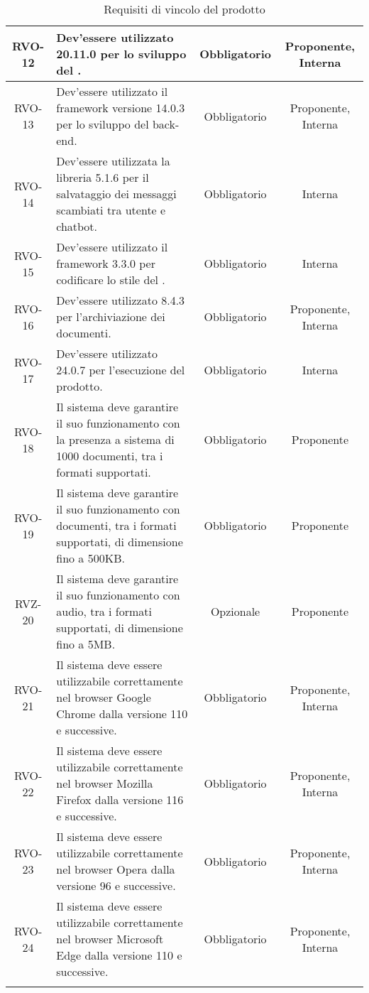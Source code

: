 \begin{xltabular}{\textwidth}{| c | X | c | c |}
    \hline
    RVO-12 & Dev'essere utilizzato  20.11.0 per lo sviluppo del . & Obbligatorio & Proponente, Interna \\
    \hline
    RVO-13 & Dev'essere utilizzato il framework  versione 14.0.3 per lo sviluppo del back-end. & Obbligatorio & Proponente, Interna \\
    \hline
    RVO-14 & Dev'essere utilizzata la libreria  5.1.6 per il salvataggio dei messaggi scambiati tra utente e chatbot. & Obbligatorio & Interna \\
    \hline
    RVO-15 & Dev'essere utilizzato il framework  3.3.0 per codificare lo stile del . & Obbligatorio & Interna \\
    \hline
    RVO-16 & Dev'essere utilizzato  8.4.3 per l'archiviazione dei documenti. & Obbligatorio & Proponente, Interna \\
    \hline
    RVO-17 & Dev'essere utilizzato  24.0.7 per l'esecuzione del prodotto. & Obbligatorio & Interna \\
    \hline
    RVO-18 & Il sistema deve garantire il suo funzionamento con la presenza a sistema di 1000 documenti, tra i formati supportati.  & Obbligatorio & Proponente\\ %
    \hline
    RVO-19 & Il sistema deve garantire il suo funzionamento con documenti, tra i formati supportati, di dimensione fino a 500KB. & Obbligatorio & Proponente\\ %
    \hline
    RVZ-20 & Il sistema deve garantire il suo funzionamento con audio, tra i formati supportati, di dimensione fino a 5MB. & Opzionale & Proponente\\
    \hline %
    RVO-21 & Il sistema deve essere utilizzabile correttamente nel browser Google Chrome dalla versione 110 e successive. & Obbligatorio & Proponente, Interna\\  %
    \hline
    RVO-22 & Il sistema deve essere utilizzabile correttamente nel browser Mozilla Firefox dalla versione 116 e successive. & Obbligatorio & Proponente, Interna\\  %
    \hline
    RVO-23 & Il sistema deve essere utilizzabile correttamente nel browser Opera dalla versione 96 e successive. & Obbligatorio & Proponente, Interna\\ %
    \hline
    RVO-24 & Il sistema deve essere utilizzabile correttamente nel browser Microsoft Edge dalla versione 110 e successive. & Obbligatorio & Proponente, Interna\\
    \hline
     \caption{Requisiti di vincolo del prodotto}
    \label{tab:reqvin}
\end{xltabular}
\endgroup

